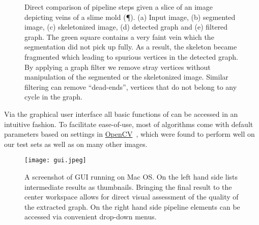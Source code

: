 	\begin{figure}
		\centering
		\qquad
		\qquad
		\qquad
		\qquad
		\qquad
		\caption[\NEFIs pipeline executed]{Direct comparison of \NEFIs pipeline steps given a slice of an image depicting veins of a slime mold (\P). (a) Input image, (b) segmented image, (c) skeletonized image, (d) detected graph and (e) filtered graph. The green square contains a very faint vein which the segmentation did not pick up fully. As a result, the skeleton became fragmented which leading to spurious vertices in the detected graph. By applying a graph filter we remove stray vertices without manipulation of the segmented or the skeletonized image. Similar filtering can remove ``dead-ends'', \ie vertices that do not belong to any cycle in the graph.}
		\label{fig:pipeline}
	\end{figure}

	Via the graphical user interface all basic functions of \NEFI can be accessed in an intuitive fashion. To facilitate ease-of-use, most of \NEFIs algorithms come with default parameters based on settings in \href{http://opencv.org/}{OpenCV}~\cite{opencv}, which were found to perform well on our test sets as well as on many other images.

	\begin{figure}
		\centering
		\texttt{[image: gui.jpeg]}
		\caption[\NEFIs graphical user interface]{A screenshot of \NEFIs GUI running on Mac OS. On the left hand side \NEFI lists intermediate results as thumbnails. Bringing the final result to the center workspace allows for direct visual assessment of the quality of the extracted graph. On the right hand side \NEFIs pipeline elements can be accessed via convenient drop-down menus.}
		\label{fig:nefi_gui}
	\end{figure}

